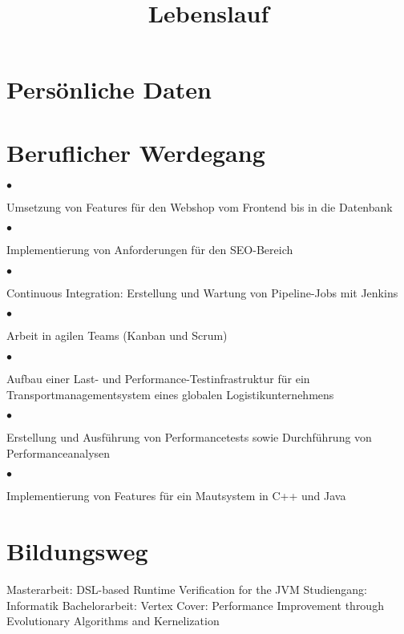 \documentclass[11pt,a4paper,sans]{moderncv}
\title{Lebenslauf}
\begin{document}
\newcommand{\shiftbullet}[1] {
        \parbox[t]{0.5em}{\vspace{#1px}$\bullet$}}

\makecvtitle

\section{Persönliche Daten}

\section{Beruflicher Werdegang}
        {$\bullet$\hspace{0.5em}\parbox[t]{\linewidth-7pt}{Umsetzung von Features für den Webshop vom Frontend bis in die Datenbank}\vspace{2pt}
         $\bullet$\hspace{0.5em}\parbox[t]{\linewidth-7pt}{Implementierung von Anforderungen für den SEO-Bereich}\vspace{2pt}
         $\bullet$\hspace{0.5em}\parbox[t]{\linewidth-7pt}{Continuous Integration: Erstellung und Wartung von Pipeline-Jobs mit Jenkins}\vspace{2pt}
         $\bullet$\hspace{0.5em}\parbox[t]{\linewidth-7pt}{Arbeit in agilen Teams (Kanban und Scrum)}}
        {$\bullet$\hspace{0.5em}\parbox[t]{\linewidth-7pt}{Aufbau einer Last- und Performance-Testinfrastruktur für ein Trans\-port\-manage\-ment\-sys\-tem eines globalen Logistikunternehmens}\vspace{2pt}
         $\bullet$\hspace{0.5em}\parbox[t]{\linewidth-7pt}{Erstellung und Ausführung von Performancetests sowie Durchführung von  Performanceanalysen}\vspace{2pt}
         $\bullet$\hspace{0.5em}\parbox[t]{\linewidth-7pt}{Implementierung von Features für ein Mautsystem in C++ und Java}\vspace{2pt}}

\section{Bildungsweg}
        {}
        {Masterarbeit: DSL-based Runtime Verification for the JVM}
        {Studiengang: Informatik}{}
        {Bachelorarbeit: Vertex Cover: Performance Improvement through Evolutionary Algorithms and Kernelization}
\end{document}
